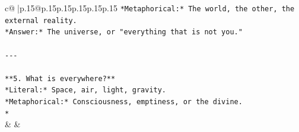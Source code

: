\documentclass{article}
\begin{document}
{\begin{supertabular}{c@{$\;$}|p{.15\linewidth}@{}p{.15\linewidth}p{.15\linewidth}p{.15\linewidth}p{.15\linewidth}p{.15\linewidth}}
{{{\texttt{*Metaphorical:* The world, the other, the external reality.  } \\
\texttt{*Answer:* The universe, or "everything that is not you."} \\
\\ 
\texttt{{-}{-}{-}} \\
\\ 
\texttt{**5. What is everywhere?**  } \\
\texttt{*Literal:* Space, air, light, gravity.  } \\
\texttt{*Metaphorical:* Consciousness, emptiness, or the divine.  } \\
\texttt{*} \\
            }
        }
    }
    & & \\ \\


\end{supertabular}}
\end{document}
